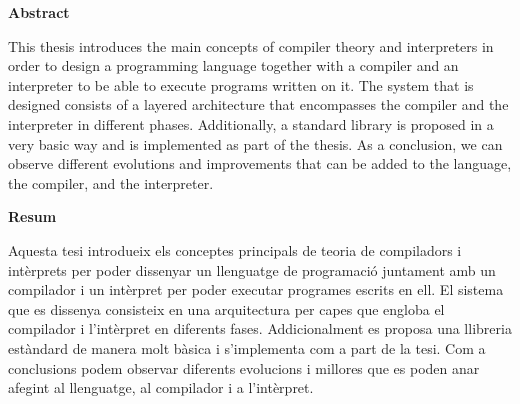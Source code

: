{}
\centerline{\textbf{Abstract}}
This thesis introduces the main concepts of compiler theory and interpreters in order to design a programming language
together with a compiler and an interpreter to be able to execute programs written on it.
The system that is designed consists of a layered architecture that encompasses the compiler and the interpreter in different phases.
Additionally, a standard library is proposed in a very basic way and is implemented as part of the thesis.
As a conclusion, we can observe different evolutions and improvements that can be added to the language, the compiler, and the interpreter.
\vfill
{}
{}
\centerline{\textbf{Resum}}
Aquesta tesi introdueix els conceptes principals de teoria de compiladors i intèrprets per poder dissenyar un llenguatge de programació
juntament amb un compilador i un intèrpret per poder executar programes escrits en ell.
El sistema que es dissenya consisteix en una arquitectura per capes que engloba el compilador i l'intèrpret en diferents fases.
Addicionalment es proposa una llibreria estàndard de manera molt bàsica i s'implementa com a part de la tesi.
Com a conclusions podem observar diferents evolucions i millores que es poden anar afegint al llenguatge, al compilador i a l'intèrpret.
